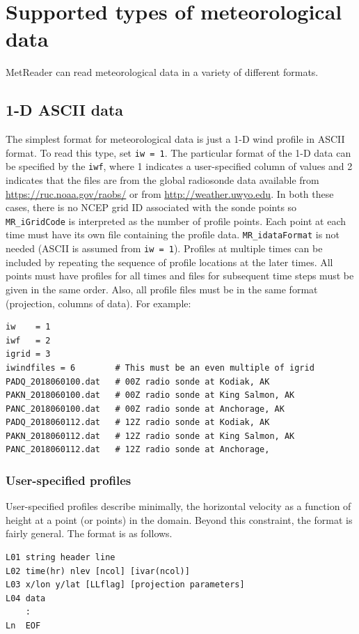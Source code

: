 \documentclass[11pt]{article}   %
\begin{document}
\section{Supported types of meteorological data}
MetReader can read meteorological data in a variety of different formats.  
\subsection{1-D ASCII data}
The simplest format for meteorological data is just a 1-D wind profile in ASCII
format.  To read this type, set \texttt{iw = 1}.  The particular format
of the 1-D data can be specified by the \texttt{iwf}, where 1 indicates a
user-specified column of values and 2 indicates that the files are from 
the global radiosonde data available from \url{https://ruc.noaa.gov/raobs/} or
from \url{http://weather.uwyo.edu}.
In both these cases, there is no NCEP grid ID associated with the sonde points so
\texttt{MR\_iGridCode} is interpreted as the number of profile points.  Each point at each
time must have its own file containing the profile data.
\texttt{MR\_idataFormat} is not needed (ASCII is assumed from \texttt{iw = 1}).
Profiles at multiple times can be included by repeating the sequence of profile
locations at the later times.  All points must have profiles for all times and files
for subsequent time steps must be given in the same order.
Also, all profile files must be in the same format (projection, columns of data).
For example:

\small
\begin{verbatim}
iw    = 1
iwf   = 2
igrid = 3
iwindfiles = 6        # This must be an even multiple of igrid
PADQ_2018060100.dat   # 00Z radio sonde at Kodiak, AK
PAKN_2018060100.dat   # 00Z radio sonde at King Salmon, AK
PANC_2018060100.dat   # 00Z radio sonde at Anchorage, AK
PADQ_2018060112.dat   # 12Z radio sonde at Kodiak, AK
PAKN_2018060112.dat   # 12Z radio sonde at King Salmon, AK
PANC_2018060112.dat   # 12Z radio sonde at Anchorage, 
\end{verbatim}
\normalsize

\subsubsection{User-specified profiles}
User-specified profiles describe minimally, the horizontal velocity as a function
of height at a point (or points) in the domain.  Beyond this constraint,
the format is fairly
general.  The format is as follows.
\small
\begin{verbatim}
L01 string header line
L02 time(hr) nlev [ncol] [ivar(ncol)]
L03 x/lon y/lat [LLflag] [projection parameters]
L04 data
    :
Ln  EOF
\end{verbatim}
\normalsize
\end{document}
